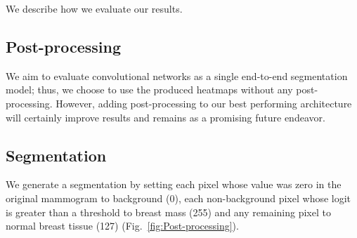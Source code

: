 We describe how we evaluate our results.

\subsection{Post-processing}
We aim to evaluate convolutional networks as a single end-to-end segmentation model;
thus, we choose to use the produced heatmaps without any post-processing. However, adding post-processing to our best performing architecture will certainly improve results and remains as a promising future endeavor.%


\subsection{Segmentation}
We generate a segmentation by setting each pixel whose value was zero in the original mammogram to background (0), each non-background pixel whose logit is greater than a threshold to breast mass (255) and any remaining pixel to normal breast tissue (127) (Fig.~\ref{fig:Post-processing}).


